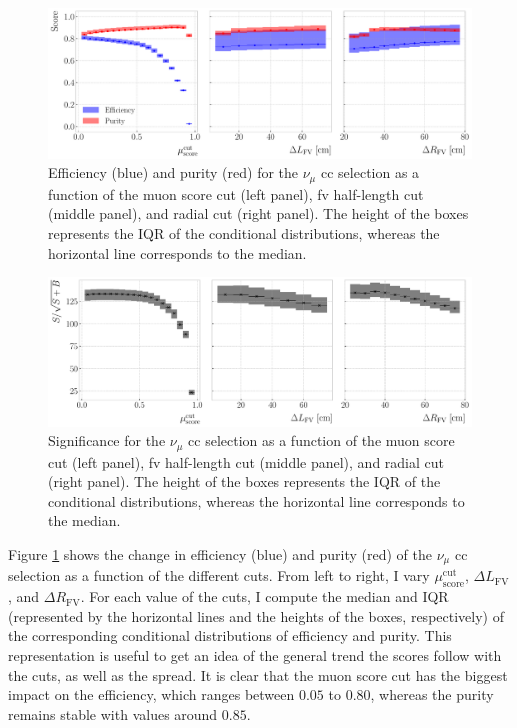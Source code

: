 \begin{figure}[t]
    \centering
    \includegraphics[width=.99\linewidth]{Images/GAr_selection/efficiency_and_purity_error_boxes.pdf}
    \caption[Efficiency and purity for the $\nu_{\mu}$ \gls{cc} selection as a function of the different cuts.]{Efficiency (blue) and purity (red) for the $\nu_{\mu}$ \gls{cc} selection as a function of the muon score cut (left panel), \gls{fv} half-length cut (middle panel), and radial cut (right panel). The height of the boxes represents the IQR of the conditional distributions, whereas the horizontal line corresponds to the median.}
    \label{fig:numuCC_metrics_opt}
\end{figure}

\begin{figure}[t]
    \centering
    \includegraphics[width=.99\linewidth]{Images/GAr_selection/significance_error_boxes.pdf}
    \caption[Significance for the $\nu_{\mu}$ \gls{cc} selection as a function of the different cuts.]{Significance for the $\nu_{\mu}$ \gls{cc} selection as a function of the muon score cut (left panel), \gls{fv} half-length cut (middle panel), and radial cut (right panel). The height of the boxes represents the IQR of the conditional distributions, whereas the horizontal line corresponds to the median.}
    \label{fig:numuCC_significance_opt}
\end{figure}

Figure \ref{fig:numuCC_metrics_opt} shows the change in efficiency (blue) and purity (red) of the $\nu_{\mu}$ \gls{cc} selection as a function of the different cuts. From left to right, I vary $\mu_{\mathrm{score}}^{\mathrm{cut}}$, $\Delta L_{\mathrm{FV}}$, and $\Delta R_{\mathrm{FV}}$. For each value of the cuts, I compute the median and IQR (represented by the horizontal lines and the heights of the boxes, respectively) of the corresponding conditional distributions of efficiency and purity. This representation is useful to get an idea of the general trend the scores follow with the cuts, as well as the spread. It is clear that the muon score cut has the biggest impact on the efficiency, which ranges between $0.05$ to $0.80$, whereas the purity remains stable with values around $0.85$.

